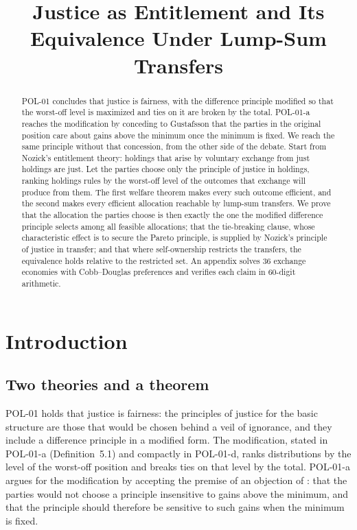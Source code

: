 \documentclass{situationist-preprint}
\title{Justice as Entitlement and Its Equivalence Under Lump-Sum Transfers}
\begin{document}
\maketitle

\begin{abstract}
POL-01 concludes that justice is fairness, with the difference principle modified so that the worst-off level is maximized and ties on it are broken by the total. POL-01-a reaches the modification by conceding to Gustafsson that the parties in the original position care about gains above the minimum once the minimum is fixed. We reach the same principle without that concession, from the other side of the debate. Start from Nozick's entitlement theory: holdings that arise by voluntary exchange from just holdings are just. Let the parties choose only the principle of justice in holdings, ranking holdings rules by the worst-off level of the outcomes that exchange will produce from them. The first welfare theorem makes every such outcome efficient, and the second makes every efficient allocation reachable by lump-sum transfers. We prove that the allocation the parties choose is then exactly the one the modified difference principle selects among all feasible allocations; that the tie-breaking clause, whose characteristic effect is to secure the Pareto principle, is supplied by Nozick's principle of justice in transfer; and that where self-ownership restricts the transfers, the equivalence holds relative to the restricted set. An appendix solves 36 exchange economies with Cobb--Douglas preferences and verifies each claim in 60-digit arithmetic.
\end{abstract}

\section{Introduction}

\subsection{Two theories and a theorem}

POL-01 holds that justice is fairness: the principles of justice for the basic structure are those that would be chosen behind a veil of ignorance, and they include a difference principle in a modified form. The modification, stated in POL-01-a (Definition~5.1) and compactly in POL-01-d, ranks distributions by the level of the worst-off position and breaks ties on that level by the total. POL-01-a argues for the modification by accepting the premise of an objection of \citet{Gustafsson2018}: that the parties would not choose a principle insensitive to gains above the minimum, and that the principle should therefore be sensitive to such gains when the minimum is fixed.
\end{document}
